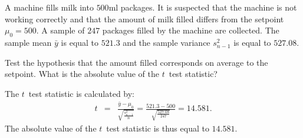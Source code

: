 
\begin{question}
A machine fills milk into $500$ml packages. It is suspected that the 
machine is not working correctly and that the amount of milk filled differs 
from the setpoint $\mu_0 = 500$. A sample of $247$ packages 
filled by the machine are collected. The sample mean $\bar{y}$ is equal to 
$521.3$ and the sample variance $s^2_{n-1}$ is equal to 
$527.08$.

Test the hypothesis that the amount filled corresponds on average to the 
setpoint. What is the absolute value of the $t$~test statistic?
\end{question}

\begin{solution}
The $t$~test statistic is calculated by:
\begin{eqnarray*}
  t & = & \frac{\bar y - \mu_0}{\sqrt{\frac{s^2_{n-1}}{n}}}
  = \frac{521.3 - 500}{\sqrt{\frac{527.08}{247}}}
  = 14.581.
\end{eqnarray*}
The absolute value of the $t$~test statistic is thus equal to
$14.581$.
\end{solution}

